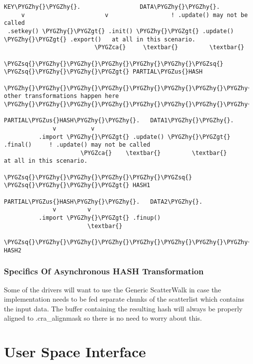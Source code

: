\documentclass[a4paper,8pt,english]{sphinxmanual}
\def\PYGZus{\char`\_}
\def\PYGZca{\char`\^}
\def\PYGZgt{\char`\>}
\def\PYGZhy{\char`\-}
\def\PYGZsq{\char`\'}
\renewcommand\PYGZsq{\textquotesingle}
\begin{document}
\begin{Verbatim}[commandchars=\\\{\}]
KEY\PYGZhy{}\PYGZhy{}.                 DATA\PYGZhy{}\PYGZhy{}.
     v                       v                  ! .update() may not be called
 .setkey() \PYGZhy{}\PYGZgt{} .init() \PYGZhy{}\PYGZgt{} .update() \PYGZhy{}\PYGZgt{} .export()   at all in this scenario.
                          \PYGZca{}     \textbar{}         \textbar{}
                          \PYGZsq{}\PYGZhy{}\PYGZhy{}\PYGZhy{}\PYGZhy{}\PYGZhy{}\PYGZsq{}         \PYGZsq{}\PYGZhy{}\PYGZhy{}\PYGZgt{} PARTIAL\PYGZus{}HASH

\PYGZhy{}\PYGZhy{}\PYGZhy{}\PYGZhy{}\PYGZhy{}\PYGZhy{}\PYGZhy{}\PYGZhy{}\PYGZhy{}\PYGZhy{}\PYGZhy{} other transformations happen here \PYGZhy{}\PYGZhy{}\PYGZhy{}\PYGZhy{}\PYGZhy{}\PYGZhy{}\PYGZhy{}\PYGZhy{}\PYGZhy{}\PYGZhy{}\PYGZhy{}

PARTIAL\PYGZus{}HASH\PYGZhy{}\PYGZhy{}.   DATA1\PYGZhy{}\PYGZhy{}.
              v          v
          .import \PYGZhy{}\PYGZgt{} .update() \PYGZhy{}\PYGZgt{} .final()     ! .update() may not be called
                      \PYGZca{}    \textbar{}         \textbar{}           at all in this scenario.
                      \PYGZsq{}\PYGZhy{}\PYGZhy{}\PYGZhy{}\PYGZhy{}\PYGZsq{}         \PYGZsq{}\PYGZhy{}\PYGZhy{}\PYGZgt{} HASH1

PARTIAL\PYGZus{}HASH\PYGZhy{}\PYGZhy{}.   DATA2\PYGZhy{}.
              v         v
          .import \PYGZhy{}\PYGZgt{} .finup()
                        \textbar{}
                        \PYGZsq{}\PYGZhy{}\PYGZhy{}\PYGZhy{}\PYGZhy{}\PYGZhy{}\PYGZhy{}\PYGZhy{}\PYGZhy{}\PYGZhy{}\PYGZhy{}\PYGZhy{}\PYGZhy{}\PYGZhy{}\PYGZhy{}\PYGZhy{}\PYGZgt{} HASH2
\end{Verbatim}


\subsection{Specifics Of Asynchronous HASH Transformation}
\label{crypto/devel-algos:specifics-of-asynchronous-hash-transformation}
Some of the drivers will want to use the Generic ScatterWalk in case the
implementation needs to be fed separate chunks of the scatterlist which
contains the input data. The buffer containing the resulting hash will
always be properly aligned to .cra\_alignmask so there is no need to
worry about this.


\chapter{User Space Interface}
\label{crypto/userspace-if:user-space-interface}\label{crypto/userspace-if::doc}
\end{document}
